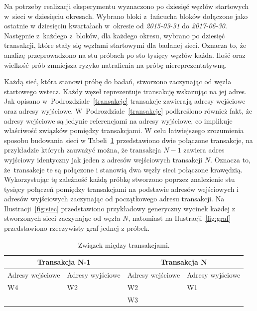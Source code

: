 \documentclass[12pt, oneside, final, openany]{mgr}
\begin{document}
\indent Na potrzeby realizacji eksperymentu wyznaczono po dziesięć węzłów startowych w~sieci w dziesięciu okresach. Wybrano bloki z~łańcucha bloków dołączone jako ostatnie w dziesięciu kwartałach w~okresie od \textit{2015-03-31} do \textit{2017-06-30}. Następnie z~każdego z~bloków, dla każdego okresu, wybrano po dziesięć transakcji, które stały się węzłami startowymi dla badanej sieci. Oznacza to, że analizę przeprowadzono na stu próbach po sto tysięcy węzłów każda. Ilość oraz wielkość prób zmniejsza ryzyko natrafienia na próbę niereprezentatywną.

\indent Każdą sieć, która stanowi próbę do badań, stworzono zaczynając od węzła startowego wstecz. Każdy węzeł reprezentuje transakcję wskazując na jej adres. Jak opisano w~Podrozdziale~\ref{transakcje} transakcje zawierają adresy wejściowe oraz adresy wyjściowe. W~Podrozdziale~\ref{transakcje} podkreślono również fakt, że adresy wejściowe są jedynie referencjami na adresy wyjściowe, co implikuje właściwość związków pomiędzy transakcjami. W celu łatwiejszego zrozumienia sposobu budowania sieci w Tabeli~\ref{tab:zwiazekTransakcji} przedstawiono dwie połączone transakcje, na przykładzie których zauważyć można, że transakcja $N-1$ zawiera adres wyjściowy identyczny jak jeden z adresów wejściowych transakcji $N$. Oznacza to, że~transakcje te są połączone i stanowią dwa węzły sieci połączone krawędzią. Wykorzystując tę zależność każdą próbkę stworzono poprzez znalezienie stu tysięcy połączeń pomiędzy transakcjami na podstawie adresów wejściowych i adresów wyjściowych zaczynając od początkowego adresu transakcji. Na Ilustracji~\ref{fig:siec} przedstawiono przykładowy generyczny wycinek każdej z stworzonych sieci zaczynając od węzła $N$, natomiast na Ilustracji~\ref{fig:graf} przedstawiono rzeczywisty graf jednej z próbek. 

\begin{table}[H]
\begin{center}
\caption{Związek między transakcjami.}
\label{tab:zwiazekTransakcji}
\begin{tabular}{|l|l|l|l|}
\hline
	\multicolumn{2}{|c|}{Transakcja N-1} 
   &\multicolumn{2}{|c|}{Transakcja N}  \\
\hline
Adresy wejściowe & Adresy wyjściowe &Adresy wejściowe & Adresy wyjściowe\\
\hline
W4 & W2 & W2 & W1 \\
&& W3 & \\
\hline 
\end{tabular}
\end{center}
\end{table}
\end{document}

